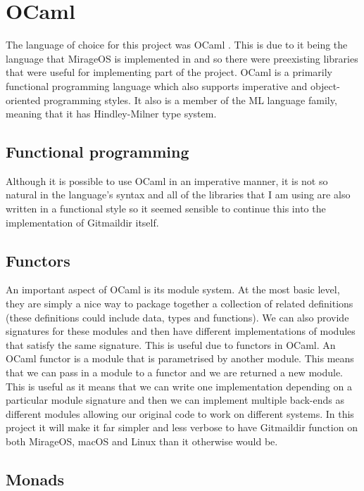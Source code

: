 \section{OCaml}

The language of choice for this project was OCaml \cite{MinskyYaron2013RwO}. This is due to it being the language that MirageOS is implemented in and so there were preexisting libraries that were useful for implementing part of the project. OCaml is a primarily functional programming language which also supports imperative and object-oriented programming styles. It also is a member of the ML language family, meaning that it has Hindley-Milner type system.

\subsection{Functional programming}

Although it is possible to use OCaml in an imperative manner, it is not so natural in the language's syntax and all of the libraries that I am using are also written in a functional style so it seemed sensible to continue this into the implementation of Gitmaildir itself.

\subsection{Functors}

An important aspect of OCaml is its module system. At the most basic level, they are simply a nice way to package together a collection of related definitions (these definitions could include data, types and functions). We can also provide signatures for these modules and then have different implementations of modules that satisfy the same signature. This is useful due to functors in OCaml. An OCaml functor is a module that is parametrised by another module. This means that we can pass in a module to a functor and we are returned a new module. This is useful as it means that we can write one implementation depending on a particular module signature and then we can implement multiple back-ends as different modules allowing our original code to work on different systems. In this project it will make it far simpler and less verbose to have Gitmaildir function on both MirageOS, macOS and Linux than it otherwise would be.

\subsection{Monads}

